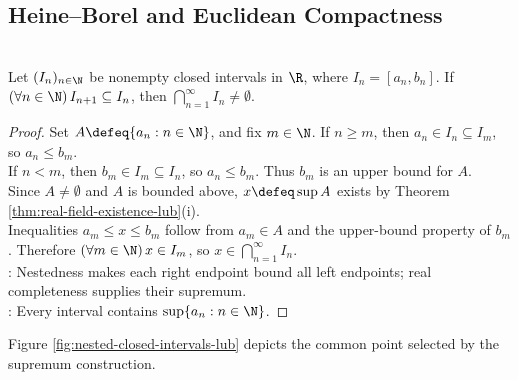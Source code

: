 \subsection{Heine--Borel and Euclidean Compactness}

\begin{theorem} \label{thm:nested-closed-intervals-intersect} \\
Let $(I_n)_{n\in\N}$ be nonempty closed intervals in $\R$, where $I_n=[a_n,b_n]$. If $(\forall n\in\N)\,I_{n+1}\subseteq I_n$, then $\bigcap\limits_{n=1}^{\infty}I_n\ne\emptyset$.
\begin{proof}
Set $A\defeq\{a_n:n\in\N\}$, and fix $m\in\N$. If $n\geq m$, then $a_n\in I_n\subseteq I_m$, so $a_n\leq b_m$.\\
If $n<m$, then $b_m\in I_m\subseteq I_n$, so $a_n\leq b_m$. Thus $b_m$ is an upper bound for $A$.\\
Since $A\ne\emptyset$ and $A$ is bounded above, $x\defeq\sup A$ exists by Theorem \ref{thm:real-field-existence-lub}(i).\\
Inequalities $a_m\leq x\leq b_m$ follow from $a_m\in A$ and the upper-bound property of $b_m$. Therefore $(\forall m\in\N)\,x\in I_m$, so $x\in\bigcap\limits_{n=1}^{\infty}I_n$.\\
: Nestedness makes each right endpoint bound all left endpoints; real completeness supplies their supremum.\\
: Every interval contains $\sup\{a_n:n\in\N\}$.
\end{proof}
\end{theorem}

Figure \ref{fig:nested-closed-intervals-lub} depicts the common point selected by the supremum construction.
\begin{illustrationfigure}[H]
  \centering
  
  \caption{The nested segments represent $I_n=[a_n,b_n]$; the marked point $x=\sup\{a_n:n\in\N\}$ lies between every endpoint pair.}
  \label{fig:nested-closed-intervals-lub}
\end{illustrationfigure}

